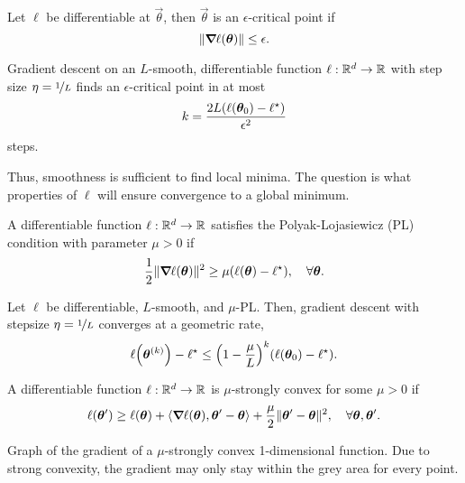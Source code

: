 \begin{definition}
    Let $\ell$ be differentiable at $\vec{\theta}$, then $\vec{\theta}$ is an $\epsilon$-critical point if \[
        \| \bm{\nabla}_{\! } \ell(\bm{\theta}) \| \leq \epsilon.
    \]
\end{definition}

\begin{lemma}
    Gradient descent on an $L$-smooth, differentiable function $\ell: \mathbb{R}^d \to \mathbb{R}$ with step size $\eta = \nicefrac{1}{L}$ finds an $\epsilon$-critical point in at most \[
        k = \frac{2L\lft(\ell\lft(\vec{\theta}_0\rgt) - \ell^\star\rgt)}{\epsilon^2}
    \]
    steps.
\end{lemma}

Thus, smoothness is sufficient to find local minima. The question is what properties of $\ell$ will
ensure convergence to a global minimum.

\begin{definition}
    A differentiable function $\ell: \mathbb{R}^d \to \mathbb{R}$ satisfies the Polyak-Lojasiewicz (PL) condition with parameter $\mu > 0$ if \[
        \frac{1}{2} \| \bm{\nabla}_{\! } \ell(\bm{\theta}) \|^2 \geq \mu (\ell(\bm{\theta}) - \ell^\star), \quad \forall \bm{\theta}.
    \]
\end{definition}

\begin{lemma}
    Let $\ell$ be differentiable, $L$-smooth, and $\mu$-PL. Then, gradient descent with stepsize $\eta = \nicefrac{1}{L}$ converges at a geometric rate, \[
        \ell\lft( \vec{\theta}^{(k)} \rgt) - \ell^\star \leq \lft( 1 - \frac{\mu}{L} \rgt)^k \lft( \ell(\vec{\theta}_0) - \ell^\star \rgt).
    \]
\end{lemma}

\begin{definition}
    A differentiable function $\ell: \mathbb{R}^d \to \mathbb{R}$ is $\mu$-strongly convex for some $\mu > 0$ if \[
        \ell(\bm{\theta}') \geq \ell(\bm{\theta}) + \langle \bm{\nabla}_{\! } \ell(\bm{\theta}), \bm{\theta}' - \bm{\theta} \rangle + \frac{\mu}{2} \| \bm{\theta}' - \bm{\theta} \|^2, \quad \forall \bm{\theta}, \bm{\theta}'.
    \]
\end{definition}

\begin{marginfigure}
    \centering
    \caption{Graph of the gradient of a $\mu$-strongly convex 1-dimensional function. Due to strong convexity, the
        gradient may only stay within the grey area for every point.}
    \label{fig:strong-convexity}
\end{marginfigure}

